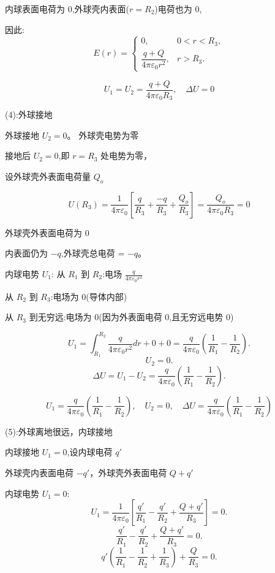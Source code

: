 \documentclass{article}
\begin{document}
内球表面电荷为 0,外球壳内表面($ r=R_2 $)电荷也为 0,

因此:
$$
E(r) =
\begin{cases}
0, & 0 < r < R_3, \\
\dfrac{q+Q}{4\pi\varepsilon_0 r^2}, & r > R_3.
\end{cases}
$$

$$
\boxed{U_1 = U_2 = \frac{q+Q}{4\pi\varepsilon_0 R_3}, \quad \Delta U = 0}
$$

\vspace{2em}

(4):外球接地

外球接地  $ U_2 = 0 $。  
外球壳电势为零

接地后 $ U_2 = 0 $,即 $ r = R_3 $ 处电势为零，

设外球壳外表面电荷量 $ Q_o $

$$U(R_3) = \frac{1}{4\pi\varepsilon_0} \left[ \frac{q}{R_3} + \frac{-q}{R_3} + \frac{Q_o}{R_3} \right] = \frac{Q_o}{4\pi\varepsilon_0 R_3} = 0$$

外球壳外表面电荷为 0

内表面仍为 $ -q $,外球壳总电荷 = $ -q $。


内球电势 $ U_1 $:
从 $ R_1 $ 到 $ R_2 $:电场 $ \frac{q}{4\pi\varepsilon_0 r^2} $  

从 $ R_2 $ 到 $ R_3 $:电场为 0(导体内部)  

从 $ R_3 $ 到无穷远:电场为 0(因为外表面电荷 0,且无穷远电势 0)  


$$U_1 = \int_{R_1}^{R_2} \frac{q}{4\pi\varepsilon_0 r^2} dr + 0 + 0= \frac{q}{4\pi\varepsilon_0} \left( \frac{1}{R_1} - \frac{1}{R_2} \right).$$
$$U_2 = 0.$$
$$\Delta U = U_1 - U_2 = \frac{q}{4\pi\varepsilon_0} \left( \frac{1}{R_1} - \frac{1}{R_2} \right).$$

$$\boxed{U_1 = \frac{q}{4\pi\varepsilon_0} \left( \frac{1}{R_1} - \frac{1}{R_2} \right), \quad U_2 = 0, \quad \Delta U = \frac{q}{4\pi\varepsilon_0} \left( \frac{1}{R_1} - \frac{1}{R_2} \right)}$$




(5):外球离地很远，内球接地

内球接地  $ U_1 = 0 $,设内球电荷 $ q' $

外球壳内表面电荷 $ -q' $，外球壳外表面电荷 $ Q + q' $


内球电势 $ U_1 = 0 $:
$$U_1 = \frac{1}{4\pi\varepsilon_0} \left[ \frac{q'}{R_1} - \frac{q'}{R_2} + \frac{Q + q'}{R_3} \right] = 0.$$
$$\frac{q'}{R_1} - \frac{q'}{R_2} + \frac{Q + q'}{R_3} = 0.$$
$$q' \left( \frac{1}{R_1} - \frac{1}{R_2} + \frac{1}{R_3} \right) + \frac{Q}{R_3} = 0.$$
\end{document}
